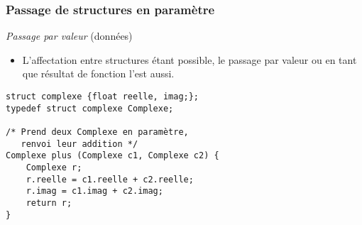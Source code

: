 \documentclass[table,handout,tikz,12pt,svgnames]{beamer}
\begin{document}
\begin{frame}[fragile=singleslide]
	\frametitle{Passage de structures en paramètre}
	\vspace{-0.7cm}
	\begin{itemize}
	\vspace{.3cm}	
	\end{itemize}
				\begin{verbatim}
struct complexe {float reelle, imag;};
typedef struct complexe Complexe;

/* Prend deux Complexe en paramètre,
   renvoi leur addition */
Complexe plus (Complexe c1, Complexe c2) {
	Complexe r;
	r.reelle = c1.reelle + c2.reelle; 
	r.imag = c1.imag + c2.imag;
	return r;
}
				\end{verbatim}
\end{frame}
\end{document}
